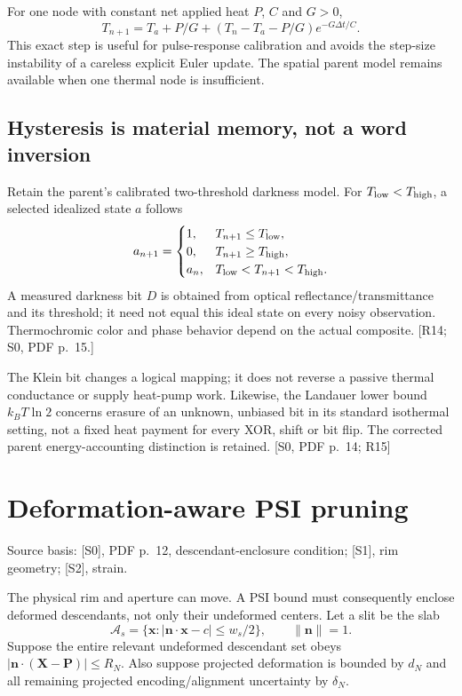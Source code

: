 \documentclass[10pt,a4paper]{article}
\numberwithin{equation}{section}
\newcommand{\src}[1]{\textcolor{muted}{\footnotesize Source basis: #1.}}
\newcommand{\newpart}{\clearpage}
\begin{document}
For one node with constant net applied heat $P$, $C$ and $G>0$,
\begin{equation}
T_{n+1}=T_a+P/G+(T_n-T_a-P/G)e^{-G\Delta t/C}.
\label{eq:thermalstep}
\end{equation}
This exact step is useful for pulse-response calibration and avoids the step-size instability of a careless explicit Euler update. The spatial parent model remains available when one thermal node is insufficient.

\subsection*{Hysteresis is material memory, not a word inversion}
Retain the parent's calibrated two-threshold darkness model. For $T_{\rm low}<T_{\rm high}$, a selected idealized state $a$ follows
\begin{equation}
a_{n+1}=\begin{cases}
1,&T_{n+1}\le T_{\rm low},\\
0,&T_{n+1}\ge T_{\rm high},\\
a_n,&T_{\rm low}<T_{n+1}<T_{\rm high}.
\end{cases}
\end{equation}
A measured darkness bit $D$ is obtained from optical reflectance/transmittance and its threshold; it need not equal this ideal state on every noisy observation. Thermochromic color and phase behavior depend on the actual composite. [R14; S0, PDF p.~15.]

The Klein bit changes a logical mapping; it does not reverse a passive thermal conductance or supply heat-pump work. Likewise, the Landauer lower bound $k_BT\ln2$ concerns erasure of an unknown, unbiased bit in its standard isothermal setting, not a fixed heat payment for every XOR, shift or bit flip. The corrected parent energy-accounting distinction is retained. [S0, PDF p.~14; R15]

\newpart
\section{Deformation-aware PSI pruning}
\label{sec:psi}
\src{[S0], PDF p.~12, descendant-enclosure condition; [S1], rim geometry; [S2], strain}

The physical rim and aperture can move. A PSI bound must consequently enclose deformed descendants, not only their undeformed centers. Let a slit be the slab
\begin{equation}
\mathcal A_s=\{\bm x:|\bm n\cdot\bm x-c|\le w_s/2\},\qquad\|\bm n\|=1.
\end{equation}
Suppose the entire relevant undeformed descendant set obeys
$|\bm n\cdot(\bm X-\bm P)|\le R_N$. Also suppose projected deformation is bounded by $d_N$ and all remaining projected encoding/alignment uncertainty by $\delta_N$.
\end{document}
